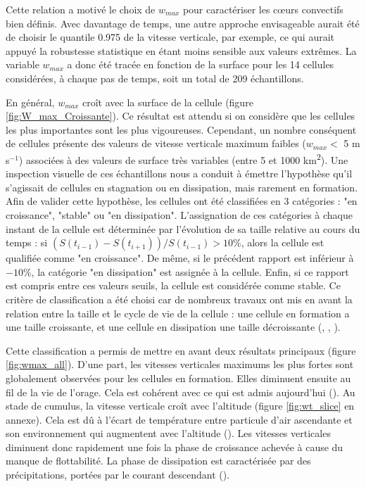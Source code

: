 \documentclass[12pt]{article}
\begin{document}
\begin{multicols}{2}
Cette relation a motivé le choix de $w_{max}$ pour caractériser les c\oe urs convectifs bien définis. Avec davantage de temps, une autre approche envisageable aurait été de choisir le quantile 0.975 de la vitesse verticale, par exemple, ce qui aurait appuyé la robustesse statistique en étant moins sensible aux valeurs extrêmes. La variable $w_{max}$ a donc été tracée en fonction de la surface pour les 14 cellules considérées, à chaque pas de temps, soit un total de 209 échantillons. 

En général, $w_{max}$ croît avec la surface de la cellule (figure \ref{fig:W_max_Croissante}). Ce résultat est attendu si on considère que les cellules les plus importantes sont les plus vigoureuses. Cependant, un nombre conséquent de cellules présente des valeurs de vitesse verticale maximum faibles ($ w_{max}<$ 5 m s$^{-1}$) associées à des valeurs de surface très variables (entre 5 et 1000 km\textsuperscript{2}). Une inspection visuelle de ces échantillons nous a conduit à émettre l'hypothèse qu'il s'agissait de cellules en stagnation ou en dissipation, mais rarement en formation. Afin de valider cette hypothèse, les cellules ont été classifiées en 3 catégories : "en croissance", "stable" ou "en dissipation". L'assignation de ces catégories à chaque instant de la cellule est déterminée par l'évolution de sa taille relative au cours du temps : si $(S(t_{i-1}) - S(t_{i+1})) / S(t_{i-1}) > 10 \% $, alors la cellule est qualifiée comme "en croissance". De même, si le précédent rapport est inférieur à $-10 \%$, la catégorie "en dissipation" est assignée à la cellule. Enfin, si ce rapport est compris entre ces valeurs seuils, la cellule est considérée comme stable. Ce critère de classification a été choisi car de nombreux travaux ont mis en avant la relation entre la taille et le cycle de vie de la cellule : une cellule en formation a une taille croissante, et une cellule en dissipation une taille décroissante (\cite{storm_lifecycle1}, \cite{storm_lifecycle2}, \cite{Zobisch}).

Cette classification a permis de mettre en avant deux résultats principaux (figure \ref{fig:wmax_all}). D'une part, les vitesses verticales maximums les plus fortes sont globalement observées pour les cellules en formation. Elles diminuent ensuite au fil de la vie de l'orage. Cela est cohérent avec ce qui est admis aujourd'hui (\cite{Zobisch}). Au stade de cumulus, la vitesse verticale croît avec l'altitude (figure \ref{fig:wt_slice} en annexe). Cela est dû à l'écart de température entre particule d'air ascendante et son environnement qui augmentent avec l'altitude (\cite{Zobisch}). Les vitesses verticales diminuent donc rapidement une fois la phase de croissance achevée à cause du manque de flottabilité. La phase de dissipation est caractérisée par des précipitations, portées par le courant descendant (\cite{Zobisch}).


\end{multicols}
\end{document}
